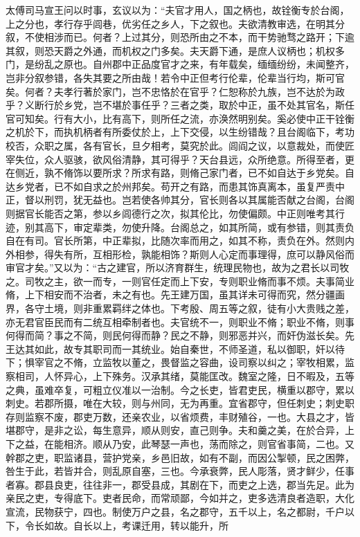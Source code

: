 \documentclass[12pt,UTF8]{ctexbook}
\begin{document}
太傅司马宣王问以时事，玄议以为：“夫官才用人，国之柄也，故铨衡专於台阁，上之分也，孝行存乎闾巷，优劣任之乡人，下之叙也。夫欲清教审选，在明其分叙，不使相涉而已。何者？上过其分，则恐所由之不本，而干势驰骛之路开；下逾其叙，则恐天爵之外通，而机权之门多矣。夫天爵下通，是庶人议柄也；机权多门，是纷乱之原也。自州郡中正品度官才之来，有年载矣，缅缅纷纷，未闻整齐，岂非分叙参错，各失其要之所由哉！若令中正但考行伦辈，伦辈当行均，斯可官矣。何者？夫孝行著於家门，岂不忠恪於在官乎？仁恕称於九族，岂不达於为政乎？义断行於乡党，岂不堪於事任乎？三者之类，取於中正，虽不处其官名，斯任官可知矣。行有大小，比有高下，则所任之流，亦涣然明别矣。奚必使中正干铨衡之机於下，而执机柄者有所委仗於上，上下交侵，以生纷错哉？且台阁临下，考功校否，众职之属，各有官长，旦夕相考，莫究於此。闾阎之议，以意裁处，而使匠宰失位，众人驱骇，欲风俗清静，其可得乎？天台县远，众所绝意。所得至者，更在侧近，孰不脩饰以要所求？所求有路，则脩己家门者，已不如自达于乡党矣。自达乡党者，已不如自求之於州邦矣。苟开之有路，而患其饰真离本，虽复严责中正，督以刑罚，犹无益也。岂若使各帅其分，官长则各以其属能否献之台阁，台阁则据官长能否之第，参以乡闾德行之次，拟其伦比，勿使偏颇。中正则唯考其行迹，别其高下，审定辈类，勿使升降。台阁总之，如其所简，或有参错，则其责负自在有司。官长所第，中正辈拟，比随次率而用之，如其不称，责负在外。然则内外相参，得失有所，互相形检，孰能相饰？斯则人心定而事理得，庶可以静风俗而审官才矣。”又以为：“古之建官，所以济育群生，统理民物也，故为之君长以司牧之。司牧之主，欲一而专，一则官任定而上下安，专则职业脩而事不烦。夫事简业脩，上下相安而不治者，未之有也。先王建万国，虽其详未可得而究，然分疆画界，各守土境，则非重累羁绊之体也。下考殷、周五等之叙，徒有小大贵贱之差，亦无君官臣民而有二统互相牵制者也。夫官统不一，则职业不脩；职业不脩，则事何得而简？事之不简，则民何得而静？民之不静，则邪恶并兴，而奸伪滋长矣。先王达其如此，故专其职司而一其统业。始自秦世，不师圣道，私以御职，奸以待下；惧宰官之不脩，立监牧以董之，畏督监之容曲，设司察以纠之；宰牧相累，监察相司，人怀异心，上下殊务。汉承其绪，莫能匡改。魏室之隆，日不暇及，五等之典，虽难卒复，可粗立仪准以一治制。今之长吏，皆君吏民，横重以郡守，累以刺史。若郡所摄，唯在大较，则与州同，无为再重。宜省郡守，但任刺史；刺史职存则监察不废，郡吏万数，还亲农业，以省烦费，丰财殖谷，一也。大县之才，皆堪郡守，是非之讼，每生意异，顺从则安，直己则争。夫和羹之美，在於合异，上下之益，在能相济。顺从乃安，此琴瑟一声也，荡而除之，则官省事简，二也。又幹郡之吏，职监诸县，营护党亲，乡邑旧故，如有不副，而因公掣顿，民之困弊，咎生于此，若皆并合，则乱原自塞，三也。今承衰弊，民人彫落，贤才鲜少，任事者寡。郡县良吏，往往非一，郡受县成，其剧在下，而吏之上选，郡当先足。此为亲民之吏，专得底下。吏者民命，而常顽鄙，今如并之，吏多选清良者造职，大化宣流，民物获宁，四也。制使万户之县，名之郡守，五千以上，名之都尉，千户以下，令长如故。自长以上，考课迁用，转以能升，所
\end{document}
